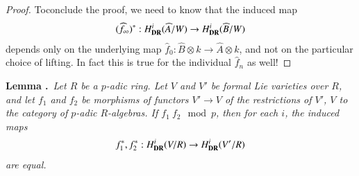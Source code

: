 \begin{proof}
To\pageoriginale conclude the proof, we need to know that the induced map
$$
(\widehat{f}_{\infty})^{*}:H^{i}_{\mathbf{DR}}(\widehat{A}/W)\to H^{i}_{\mathbf{DR}}(\widehat{B}/W)
$$
depends only on the underlying map $\widehat{f}_{0}:\widehat{B}\otimes k\to \widehat{A}\otimes k$, and not on the particular choice of lifting. In fact this is true for the individual $\widehat{f}_{n}$ as well!
\end{proof}

\medskip
\noindent
{\bf Lemma .\label{art6-lem5.8.3}}~{\em Let $R$ be a $p$-adic ring. Let $V$ and $V'$ be formal Lie varieties over $R$, and let $f_{1}$ and $f_{2}$ be morphisms of functors $V'\to V$ of the restrictions of $V'$, $V$ to the category of $p$-adic $R$-algebras. If $f_{1} \ f_{2} \mod p$, then for each $i$, the induced maps}
$$
f^{*}_{1},f^{*}_{2}:H^{i}_{\mathbf{DR}}(V/R)\to H^{i}_{\mathbf{DR}}(V'/R)
$$
{\em are equal.}
\smallskip


